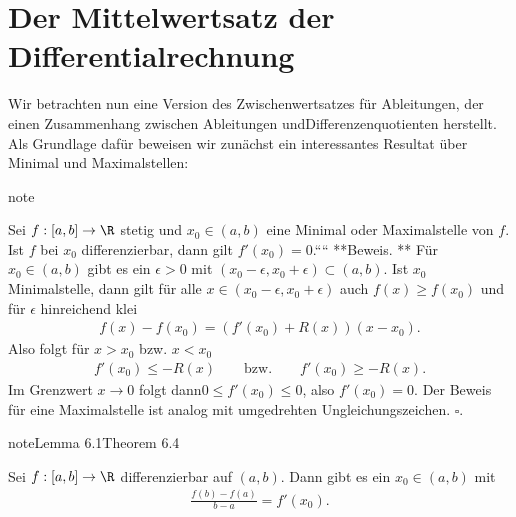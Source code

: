 \documentclass[letterpaper,10pt,english]{jupyterBook}
\begin{document}
\section{Der Mittelwertsatz der Differentialrechnung}
\label{\detokenize{differential/mws:der-mittelwertsatz-der-differentialrechnung}}\label{\detokenize{differential/mws::doc}}
Wir betrachten nun eine Version des Zwischenwertsatzes für Ableitungen, der einen Zusammenhang zwischen Ableitungen undDifferenzenquotienten herstellt. Als Grundlage dafür beweisen wir zunächst ein interessantes Resultat über Minimal\sphinxhyphen{} und Maximalstellen:
\label{differential/mws:lemma-0}
\begin{sphinxadmonition}{note}{}



Sei \(f:[a,b] \rightarrow \R\) stetig und \(x_0 \in (a,b)\) eine Minimal\sphinxhyphen{} oder Maximalstelle von \(f\). Ist \(f\) bei \(x_0\) differenzierbar, dann gilt \(f'(x_0) = 0\).````
**Beweis. ** Für \(x_0 \in (a,b)\) gibt es ein \(\epsilon > 0\) mit \((x_0 - \epsilon, x_0 + \epsilon) \subset (a,b)\). Ist \(x_0\) Minimalstelle, dann gilt für alle \(x \in (x_0 - \epsilon, x_0 + \epsilon)\) auch \(f(x) \geq f(x_0)\) und für \(\epsilon\) hinreichend klei
\begin{equation*}
\begin{split} f(x) - f(x_0) = (f'(x_0) + R(x))(x-x_0).\end{split}
\end{equation*}
Also folgt für \(x > x_0\) bzw. \(x < x_0\)
\begin{equation*}
\begin{split} f'(x_0) \leq -  R(x) \qquad \text{bzw.} \qquad f'(x_0) \geq  - R(x).\end{split}
\end{equation*}
Im Grenzwert \(x \rightarrow 0\) folgt dann\( 0 \leq f'(x_0) \leq 0\), also \(f'(x_0) = 0\). Der Beweis für eine Maximalstelle ist analog mit umgedrehten Ungleichungszeichen. \(\square\).
\label{differential/mws:theorem-1}
\begin{sphinxadmonition}{note}{Lemma 6.1Theorem 6.4}



Sei \(f:[a,b] \rightarrow \R\) differenzierbar auf \((a,b)\). Dann gibt es ein \(x_0 \in (a,b)\) mit
\begin{equation*}
\begin{split} \frac{f(b) - f(a)}{b-a} = f'(x_0) .\end{split}
\end{equation*}\end{sphinxadmonition}
\end{sphinxadmonition}
\end{document}
